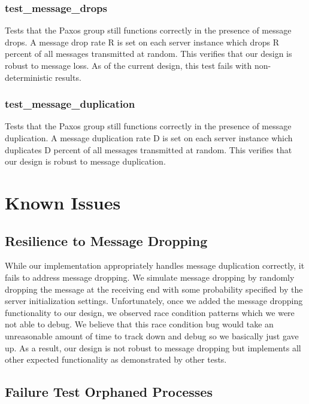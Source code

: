 \documentclass{article}
\begin{document}
\subsubsection{test\_message\_drops}

Tests that the Paxos group still functions correctly in the presence of message drops.
A message drop rate R is set on each server instance which drops R percent of all messages transmitted at random.
This verifies that our design is robust to message loss. As of the current design, this test fails with non-deterministic results.

\subsubsection{test\_message\_duplication}

Tests that the Paxos group still functions correctly in the presence of message duplication.
A message duplication rate D is set on each server instance which duplicates D percent of all messages transmitted at random.
This verifies that our design is robust to message duplication.


\section{Known Issues}

\subsection{Resilience to Message Dropping}

While our implementation appropriately handles message duplication correctly, it fails to address message dropping.
We simulate message dropping by randomly dropping the message at the receiving end with some probability specified by the server initialization settings.
Unfortunately, once we added the message dropping functionality to our design, we observed race condition patterns which we were not able to debug.
We believe that this race condition bug would take an unreasonable amount of time to track down and debug so we basically just gave up.
As a result, our design is not robust to message dropping but implements all other expected functionality as demonstrated by other tests.

\subsection{Failure Test Orphaned Processes}
\end{document}
